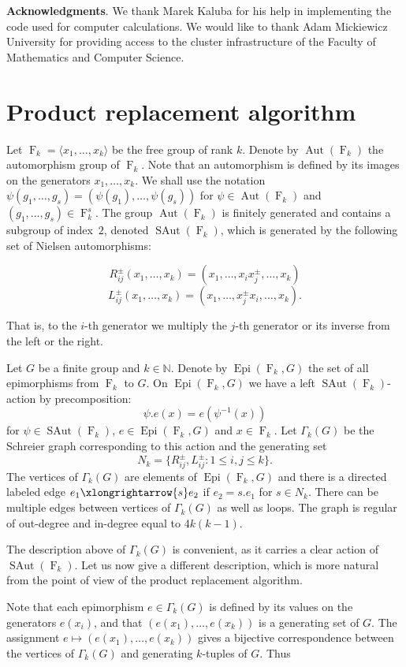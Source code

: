\documentclass[12pt]{amsart}
\theoremstyle{definition}
\numberwithin{figure}{section}
\numberwithin{table}{section}
\numberwithin{equation}{section}
\newcommand{\la}{\langle}
\newcommand{\ra}{\rangle}
\newcommand{\Aut}{\operatorname{Aut}}
\newcommand{\SAut}{\operatorname{SAut}}
\newcommand{\Epi}{\operatorname{Epi}}
\newcommand{\F}{\operatorname{F}}
\begin{document}
\textbf{Acknowledgments}. We thank Marek Kaluba for his help in implementing the code used for computer calculations. We would like to thank Adam Mickiewicz University for providing access to the cluster infrastructure of the Faculty of Mathematics and Computer Science.

\section{Product replacement algorithm}\label{s:pra}

Let $\F_k = \la x_1, \ldots, x_k \ra$ be the free group of rank $k$. Denote by $\Aut(\F_k)$ the automorphism group of $\F_k$. Note that an automorphism is defined by its images on the generators $x_1, \ldots, x_k$. We shall use the notation $\psi(g_1,\ldots,g_s) = (\psi(g_1),\ldots,\psi(g_s))$ for $\psi \in \Aut(\F_k)$ and $(g_1,\ldots,g_s) \in \F_k^s$.
The group $\Aut(\F_k)$ is finitely generated and contains a subgroup of index~$2$, denoted $\SAut(\F_k)$, which is generated by the following set of Nielsen automorphisms:

$$
R_{ij}^\pm(x_1,\ldots,x_k) = (x_1,\ldots,x_ix_j^\pm,\ldots,x_k)
$$
$$
L_{ij}^\pm(x_1,\ldots,x_k) = (x_1,\ldots,x_j^\pm x_i,\ldots,x_k).
$$


That is, to the $i$-th generator we multiply the $j$-th generator or its inverse from the left or the right.

Let $G$ be a finite group and $k \in \mathbb{N}$.
Denote by $\Epi(\F_k,G)$ the set of all epimorphisms from $\F_k$ to $G$. On $\Epi(\F_k,G)$ we have a left $\SAut(\F_k)$-action by precomposition:
$$\psi.e(x) = e(\psi^{-1}(x))$$ 
for $\psi \in \SAut(\F_k)$, $e \in \Epi(\F_k,G)$ and $x \in \F_k$.
Let  $\Gamma_k(G)$ be the Schreier graph corresponding to this action and the generating set 
$$N_k = \{ R^\pm_{ij}, L^\pm_{ij} \colon 1 \leq i,j \leq k \}.$$
The vertices of $\Gamma_k(G)$ are elements of $\Epi(\F_k,G)$ and there is a directed labeled edge $e_1 \xlongrightarrow{s} e_2$ if $e_2 = s.e_1$ for $s \in N_k$. There can be multiple edges between vertices of $\Gamma_k(G)$ as well as loops. The graph is regular of out-degree and in-degree equal to $4k(k-1)$.

The description above of $\Gamma_k(G)$ is convenient, as it carries a clear action of $\SAut(\F_k)$.
Let us now give a different description, which is more natural from the point of view of the product replacement algorithm. 

Note that each epimorphism $e \in \Gamma_k(G)$ is defined by its values on the generators $e(x_i)$, and that $(e(x_1),\ldots,e(x_k))$ is a generating set of $G$.
The assignment $e \mapsto (e(x_1),\ldots,e(x_k))$ gives a bijective correspondence between the vertices of $\Gamma_k(G)$ and generating $k$-tuples of $G$. Thus
\end{document}
